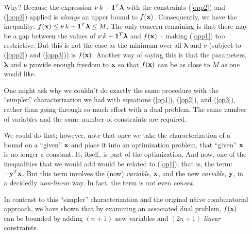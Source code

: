 \documentclass[12pt]{article}
\begin{document}
Why? Because the expression $\nu \, k + {\bf 1}^T {\boldsymbol \lambda}$ with
the constraints (\ref{opp2}) and (\ref{opp3}) applied is {\it always\/} 
an upper bound to $f({\bf x})$. 
Consequently, we have the inequality: 
$f({\bf x}) \le \nu \, k + {\bf 1}^T {\boldsymbol \lambda} \le M$.
The only concern remaining is that there may be a gap between the values of 
$\nu \, k + {\bf 1}^T {\boldsymbol \lambda}$ 
and $f({\bf x})$ -- making (\ref{opp1}) too restrictive. 
But this is not the case as the minimum over all ${\boldsymbol \lambda}$ 
and $\nu$ (subject to (\ref{opp2}) and (\ref{opp3})) is $f({\bf x})$.
Another way of saying this is that the parameters, ${\boldsymbol \lambda}$ 
and $\nu$ provide enough freedom to ${\bf x}$ so that $f({\bf x})$ can be 
as close to $M$ as one would like.


One might ask why we couldn't do exactly the same procedure with the ``simpler''
characterization we had with equations
(\ref{op1}), (\ref{op2}), and (\ref{op3}), rather than going through so much 
effort with a dual problem. The same number of variables and the same number 
of constraints are required.

We could do that; however, note that once we take the characterization of a 
bound on a ``given'' ${\bf x}$ and place it into an optimization problem, that 
``given'' ${\bf x}$ is no longer a constant. It, itself, is part of the 
optimization. And now, one of the inequalities that we would add
would be related to (\ref{op1}); that is, the term: $-{\bf y}^T {\bf x}$. But 
this term involves the (now) {\it variable\/}, ${\bf x}$, and the new 
{\it variable\/}, ${\bf y}$, in a decidedly {\it non-linear\/} way.
In fact, the term is not even {\it convex\/}.

In contrast to this ``simpler'' characterization and the original n{\"a}ive 
combinatorial approach, we have shown that 
by examining an associated dual problem, $f({\bf x})$ can be bounded by
adding $(n+1)$ new variables and $(2n + 1)$ {\it linear\/} constraints.
\end{document}
